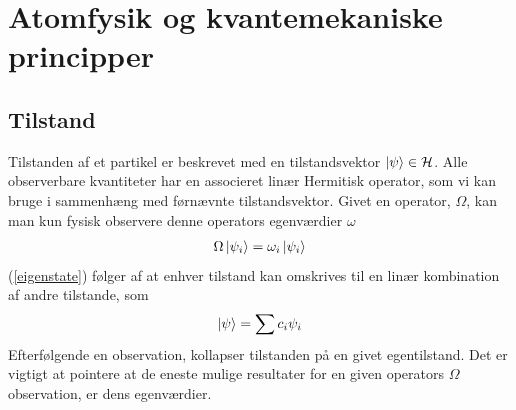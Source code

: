 \documentclass[12pt]{article}
\theoremstyle{definition}
\theoremstyle{remark}
\theoremstyle{definition}
\numberwithin{equation}{section}
\begin{document}
\section{Atomfysik og kvantemekaniske principper}
\subsection{}

\subsection{Tilstand}
Tilstanden af et partikel er beskrevet med en tilstandsvektor $\ket
\psi\in \mathcal H$. Alle observerbare kvantiteter har en associeret linær Hermitisk operator, som vi kan bruge i sammenhæng med førnævnte tilstandsvektor. Givet en operator, $\Omega$, kan man kun fysisk observere denne operators egenværdier $\omega$
\begin{align}
    \label{eigenstate}
    \Omega\ket{\psi_i} = \omega_i \ket{\psi_i}
\end{align}
(\ref{eigenstate}) følger af at enhver tilstand kan omskrives til en linær kombination af andre tilstande, som
\begin{align}
    \ket \psi = \sum c_i \psi_i
\end{align}
Efterfølgende en observation, kollapser tilstanden på en givet egentilstand. Det er vigtigt at pointere at de eneste mulige resultater for en given operators $\Omega$ observation, er dens egenværdier.
\end{document}
